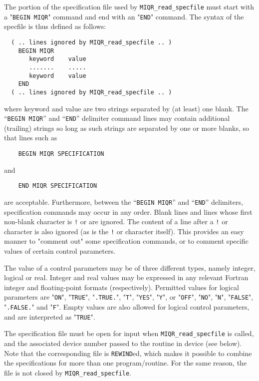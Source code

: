 \documentclass{galahad}
\newcommand{\packagename}{MIQR}
\begin{document}
The portion of the specification file used by
{\tt \packagename\_read\_specfile}
must start
with a "{\tt BEGIN \packagename}" command and end with an
"{\tt END}" command.  The syntax of the specfile is thus defined as follows:
\begin{verbatim}
  ( .. lines ignored by MIQR_read_specfile .. )
    BEGIN MIQR
       keyword    value
       .......    .....
       keyword    value
    END
  ( .. lines ignored by MIQR_read_specfile .. )
\end{verbatim}
where keyword and value are two strings separated by (at least) one blank.
The ``{\tt BEGIN \packagename}'' and ``{\tt END}'' delimiter command lines
may contain additional (trailing) strings so long as such strings are
separated by one or more blanks, so that lines such as
\begin{verbatim}
    BEGIN MIQR SPECIFICATION
\end{verbatim}
and
\begin{verbatim}
    END MIQR SPECIFICATION
\end{verbatim}
are acceptable. Furthermore,
between the
``{\tt BEGIN \packagename}'' and ``{\tt END}'' delimiters,
specification commands may occur in any order.  Blank lines and
lines whose first non-blank character is {\tt !} or {\tt *} are ignored.
The content
of a line after a {\tt !} or {\tt *} character is also
ignored (as is the {\tt !} or {\tt *}
character itself). This provides an easy manner to "comment out" some
specification commands, or to comment specific values
of certain control parameters.

The value of a control parameters may be of three different types, namely
integer, logical or real.
Integer and real values may be expressed in any relevant Fortran integer and
floating-point formats (respectively). Permitted values for logical
parameters are "{\tt ON}", "{\tt TRUE}", "{\tt .TRUE.}", "{\tt T}",
"{\tt YES}", "{\tt Y}", or "{\tt OFF}", "{\tt NO}",
"{\tt N}", "{\tt FALSE}", "{\tt .FALSE.}" and "{\tt F}".
Empty values are also allowed for
logical control parameters, and are interpreted as "{\tt TRUE}".

The specification file must be open for
input when {\tt \packagename\_read\_specfile}
is called, and the associated device number
passed to the routine in device (see below).
Note that the corresponding
file is {\tt REWIND}ed, which makes it possible to combine the specifications
for more than one program/routine.  For the same reason, the file is not
closed by {\tt \packagename\_read\_specfile}.
\end{document}
